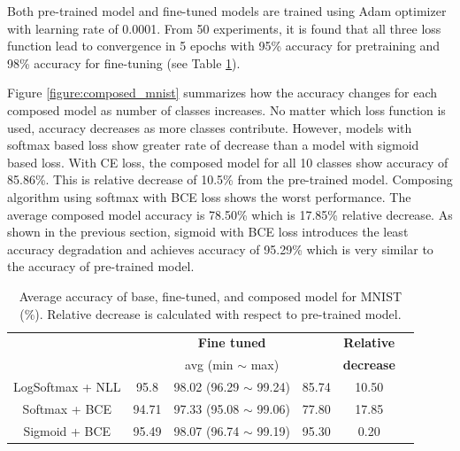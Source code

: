 \documentclass{article}
\begin{document}
Both pre-trained model and fine-tuned models are trained using Adam optimizer with learning rate of 0.0001. From 50 experiments, it is found that all three loss function lead to convergence in 5 epochs with 95\% accuracy for pretraining and 98\% accuracy for fine-tuning (see Table \ref{table:mnist}).

Figure \ref{figure:composed_mnist} summarizes how the accuracy changes for each composed model as number of classes increases. No matter which loss function is used, accuracy decreases as more classes contribute. However, models with softmax based loss show greater rate of decrease than a model with sigmoid based loss. With CE loss, the composed model for all 10 classes show accuracy of 85.86\%. This is relative decrease of 10.5\% from the pre-trained model. Composing algorithm using softmax with BCE loss shows the worst performance. The average composed model accuracy is 78.50\% which is 17.85\% relative decrease. As shown in the previous section, sigmoid with BCE loss introduces the least accuracy degradation and achieves accuracy of 95.29\% which is very similar to the accuracy of pre-trained model.

\begin{table}[t]
    \centering
    \begin{tabular}{cccccc}
        \toprule[1pt]
        \multirow{2}{*}{\raisebox{-3\heavyrulewidth}{\bf Loss function}} &
        \multirow{2}{*}{\raisebox{-3\heavyrulewidth}{\bf Pre-trained }} &
        \textbf{Fine tuned} &
        \multirow{2}{*}{\raisebox{-3\heavyrulewidth}{ \bf Composed }} &
        \textbf{ Relative } \\
        & & avg (min $\sim$ max) & & \textbf{ decrease } \\
        \midrule
        LogSoftmax + NLL & 95.8 & 98.02 (96.29 $\sim$ 99.24) & 85.74 & 10.50 \\
        Softmax + BCE & 94.71 & 97.33 (95.08 $\sim$ 99.06) & 77.80 & 17.85 \\
        Sigmoid + BCE & 95.49 & 98.07 (96.74 $\sim$ 99.19) & 95.30 & 0.20 \\
        \bottomrule[1pt]
    \end{tabular}
    \caption{Average accuracy of base, fine-tuned, and composed model for MNIST (\%). Relative decrease is calculated with respect to pre-trained model.}
    \label{table:mnist}
\end{table}
\end{document}
